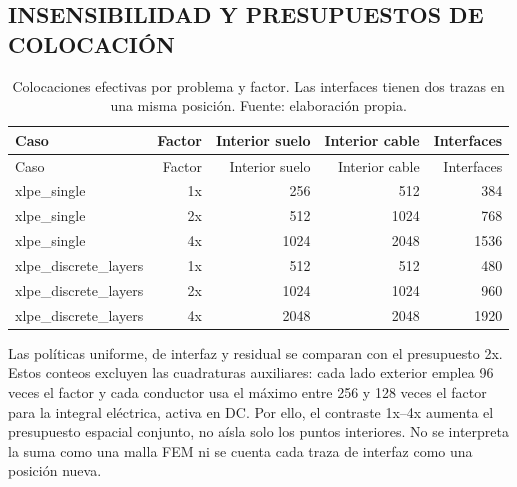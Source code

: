 \subsection{INSENSIBILIDAD Y PRESUPUESTOS DE COLOCACIÓN}

\begingroup\footnotesize\setlength{\tabcolsep}{3pt}
\begin{longtable}{L{4.2cm}rrrr}
\caption{Colocaciones efectivas por problema y factor. Las interfaces tienen dos trazas en una misma posición. Fuente: elaboración propia.}\label{tab:explicit-point-counts}\\
\toprule
Caso & Factor & Interior suelo & Interior cable & Interfaces\\
\midrule\endfirsthead
\toprule
Caso & Factor & Interior suelo & Interior cable & Interfaces\\
\midrule\endhead
xlpe\_single & 1x & 256 & 512 & 384\\
xlpe\_single & 2x & 512 & 1024 & 768\\
xlpe\_single & 4x & 1024 & 2048 & 1536\\
xlpe\_discrete\_layers & 1x & 512 & 512 & 480\\
xlpe\_discrete\_layers & 2x & 1024 & 1024 & 960\\
xlpe\_discrete\_layers & 4x & 2048 & 2048 & 1920\\
\bottomrule\end{longtable}\endgroup

Las políticas uniforme, de interfaz y residual se comparan con el presupuesto 2x. Estos conteos excluyen las cuadraturas auxiliares: cada lado exterior emplea 96 veces el factor y cada conductor usa el máximo entre 256 y 128 veces el factor para la integral eléctrica, activa en DC. Por ello, el contraste 1x--4x aumenta el presupuesto espacial conjunto, no aísla solo los puntos interiores. No se interpreta la suma como una malla FEM ni se cuenta cada traza de interfaz como una posición nueva.

